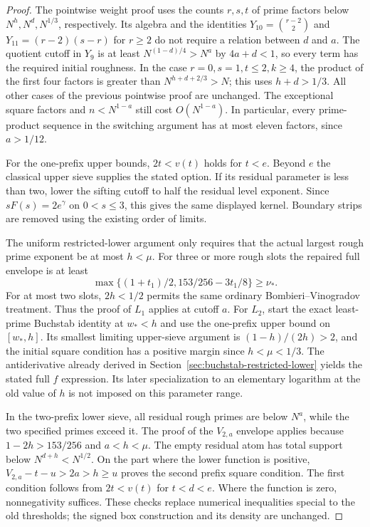 \documentclass[11pt]{article}
\begin{document}
\begin{proof}
The pointwise weight proof uses the counts $r,s,t$ of prime factors
below $N^h,N^d,N^{1/3}$, respectively. Its algebra and the identities
$Y_{10}=\binom{r-2}{2}$ and $Y_{11}=(r-2)(s-r)$ for $r\ge2$
do not require a relation between $d$ and $a$.
The quotient cutoff in $Y_9$ is at least $N^{(1-d)/4}>N^a$ by
$4a+d<1$, so every term has the required initial roughness.
In the case $r=0,s=1,t\le2,k\ge4$, the product of the first four
factors is greater than $N^{h+d+2/3}>N$; this uses $h+d>1/3$.
All other cases of the previous pointwise proof are unchanged.
The exceptional square factors and $n<N^{1-a}$ still cost
$O(N^{1-a})$. In particular, every prime-product sequence in the
switching argument has at most eleven factors, since $a>1/12$.

For the one-prefix upper bounds, $2t<v(t)$ holds for $t<e$.
Beyond $e$ the classical upper sieve supplies the stated option.
If its residual parameter is less than two, lower the sifting cutoff
to half the residual level exponent. Since $sF(s)=2e^\gamma$ on
$0<s\le3$, this gives the same displayed kernel. Boundary strips
are removed using the existing order of limits.

The uniform restricted-lower argument only requires that the actual
largest rough prime exponent be at most $h<\mu$. For three or more
rough slots the repaired full envelope is at least
\[
 \max\{(1+t_1)/2,153/256-3t_1/8\}\ge\nu_*.
\]
For at most two slots, $2h<1/2$ permits the same ordinary
Bombieri--Vinogradov treatment. Thus the proof of $L_1$ applies at
cutoff $a$. For $L_2$, start the exact least-prime Buchstab identity
at $w_*<h$ and use the one-prefix upper bound on $[w_*,h]$.
Its smallest limiting upper-sieve argument is
$(1-h)/(2h)>2$, and the initial square condition has a positive
margin since $h<\mu<1/3$. The antiderivative already derived in
Section~\ref{sec:buchstab-restricted-lower} yields the stated full
$f$ expression. Its later specialization to an elementary logarithm
at the old value of $h$ is not imposed on this parameter range.

In the two-prefix lower sieve, all residual rough primes are below
$N^a$, while the two specified primes exceed it. The proof of the
$V_{2,a}$ envelope applies because $1-2h>153/256$ and $a<h<\mu$.
The empty residual atom has total support below $N^{d+h}<N^{1/2}$.
On the part where the lower function is positive,
$V_{2,a}-t-u>2a>h\ge u$ proves the second prefix square condition.
The first condition follows from $2t<v(t)$ for $t<d<e$.
Where the function is zero, nonnegativity suffices.
These checks replace numerical inequalities special to the old
thresholds; the signed box construction and its density are unchanged.


\end{proof}
\end{document}
